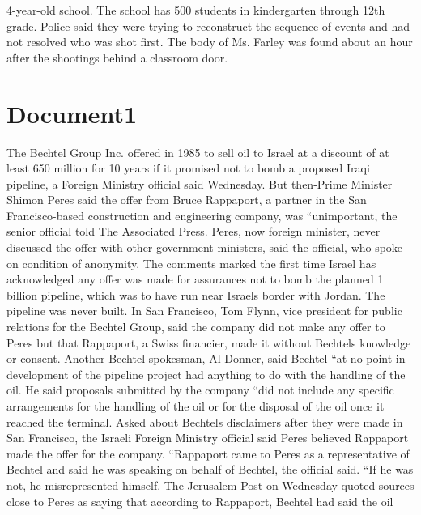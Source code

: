 \documentclass{article}
\begin{document}
4-year-old school. The school has 500 students in kindergarten through 12th grade. Police said they were trying to reconstruct the sequence of events and had not resolved who was shot first. The body of Ms. Farley was found about an hour after the shootings behind a classroom door. 

\color[rgb]{0,0,0}\section{Document1}
\color[rgb]{0.9137254901960784,0.34509803921568627,0.1568627450980392}The Bechtel Group Inc. offered in 1985 to sell \color[rgb]{0.8666666666666667,0.11372549019607843,0.5411764705882353}oil to \color[rgb]{0.9137254901960784,0.34509803921568627,0.1568627450980392}Israel at a \color[rgb]{0.9647058823529412,0.1568627450980392,0.9411764705882353}discount of at \color[rgb]{0.9137254901960784,0.34509803921568627,0.1568627450980392}least 650 million for 10 years if it promised not to bomb a proposed Iraqi pipeline, a Foreign Ministry official said Wednesday. But then-Prime Minister Shimon Peres said the offer from Bruce Rappaport, a partner in the San Francisco-based construction and engineering company, was ``unimportant, the senior official told The Associated Press. Peres, now foreign minister, never discussed the offer with other government \color[rgb]{0.8666666666666667,0.11372549019607843,0.5411764705882353}ministers, said the \color[rgb]{0.9137254901960784,0.34509803921568627,0.1568627450980392}official, who spoke on condition of anonymity. The comments marked the first time Israel has acknowledged any offer was made for assurances not to bomb the planned 1 billion pipeline, which was to have run near Israels border with Jordan. The pipeline was never built. In San Francisco, Tom Flynn, vice president for public relations for the Bechtel Group, said the company did not make any offer to Peres but that Rappaport, a Swiss financier, made it without Bechtels knowledge or consent. Another Bechtel spokesman, Al Donner, said Bechtel ``at no point in development of the pipeline project had anything to do with the handling of the \color[rgb]{0.9647058823529412,0.1568627450980392,0.9411764705882353}oil. He said \color[rgb]{0.9137254901960784,0.34509803921568627,0.1568627450980392}proposals submitted by the company ``did not include any specific arrangements for the handling of the \color[rgb]{0.9647058823529412,0.1568627450980392,0.9411764705882353}oil or for the \color[rgb]{0.9137254901960784,0.34509803921568627,0.1568627450980392}disposal of the \color[rgb]{0.9647058823529412,0.1568627450980392,0.9411764705882353}oil \color[rgb]{0.9137254901960784,0.34509803921568627,0.1568627450980392}once it reached the terminal. Asked about Bechtels disclaimers after they were made in San Francisco, the Israeli Foreign Ministry official said Peres believed Rappaport made the offer for the company. ``Rappaport came to Peres as a representative of Bechtel and said he was speaking on behalf of Bechtel, the official said. ``If he was not, he misrepresented himself. The Jerusalem Post on Wednesday quoted sources close to Peres as saying that according to Rappaport, Bechtel had said the \color[rgb]{0.9647058823529412,0.1568627450980392,0.9411764705882353}oil 
\end{document}
